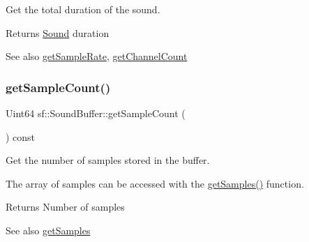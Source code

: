 Get the total duration of the sound. 

\begin{DoxyReturn}{Returns}
\mbox{\hyperlink{classsf_1_1_sound}{Sound}} duration
\end{DoxyReturn}
\begin{DoxySeeAlso}{See also}
\mbox{\hyperlink{classsf_1_1_sound_buffer_a2c2cf0078ce0549246ecc4a1646212b4}{get\+Sample\+Rate}}, \mbox{\hyperlink{classsf_1_1_sound_buffer_a127707b831d875ed790eef1aa2b9fcc3}{get\+Channel\+Count}} \begin{DoxyVerb}\end{DoxyVerb}
 
\end{DoxySeeAlso}
\mbox{\label{classsf_1_1_sound_buffer_aebe2a4bdbfbd9249353748da3f6a4fa1}} 
\subsubsection{\texorpdfstring{getSampleCount()}{getSampleCount()}}
{\footnotesize\ttfamily Uint64 sf\+::\+Sound\+Buffer\+::get\+Sample\+Count (\begin{DoxyParamCaption}{ }\end{DoxyParamCaption}) const}



Get the number of samples stored in the buffer. 

The array of samples can be accessed with the \mbox{\hyperlink{classsf_1_1_sound_buffer_ab9b2525a8da64cb266ba728aff7adecb}{get\+Samples()}} function.

\begin{DoxyReturn}{Returns}
Number of samples
\end{DoxyReturn}
\begin{DoxySeeAlso}{See also}
\mbox{\hyperlink{classsf_1_1_sound_buffer_ab9b2525a8da64cb266ba728aff7adecb}{get\+Samples}} \begin{DoxyVerb}\end{DoxyVerb}
 
\end{DoxySeeAlso}
\mbox{\label{classsf_1_1_sound_buffer_a2c2cf0078ce0549246ecc4a1646212b4}} 
